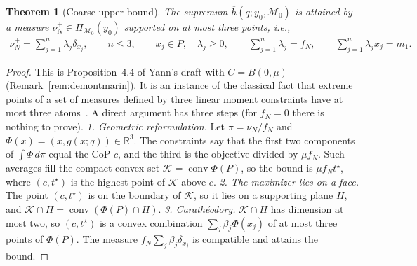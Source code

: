 \documentclass[11pt,a4paper]{article}
\theoremstyle{plain}
\newtheorem{theorem}{Theorem}[section]
\newcommand{\R}{\mathbb{R}}
\begin{document}
\begin{theorem}[Coarse upper bound]
\label{prop:coarse_upper_atomic}
    The supremum $\overline h(q;y_0,\mathcal M_0)$ is attained by a measure $\nu_N^+\in\Pi_{\mathcal M_0}(y_0)$ supported on at most three points, i.e.,
    \begin{align}
        \nu_N^+
        =
        \sum_{j=1}^{n}\lambda_j\delta_{x_j},
        \qquad n\leq 3,
        \qquad x_j\in P,\quad \lambda_j\geq 0,
        \qquad
        \sum_{j=1}^{n}\lambda_j=f_N,
        \qquad
        \sum_{j=1}^{n}\lambda_jx_j=m_1.
    \end{align}
\end{theorem}
\begin{proof}
    This is Proposition~4.4 of Yann's draft with $C=B(0,\mu)$ (Remark~\ref{rem:demontmarin}). It is an instance of the classical fact that extreme points of a set of measures defined by three
    linear moment constraints have at most three atoms~\cite{winkler1988extreme,lasserre2010moments}. A direct argument has three steps (for $f_N=0$ there is nothing to prove).
    \textit{1. Geometric reformulation.} Let $\pi=\nu_N/f_N$ and $\Phi(x)=(x,g(x;q))\in\R^3$. The constraints say that the first two components of $\int\Phi\,d\pi$ equal the CoP $c$, and the third
    is the objective divided by $\mu f_N$. Such averages fill the compact convex set $\mathcal K=\operatorname{conv}\Phi(P)$, so the bound is $\mu f_Nt^\star$, where $(c,t^\star)$ is the highest point of $\mathcal K$ above $c$.
    \textit{2. The maximizer lies on a face.} The point $(c,t^\star)$ is on the boundary of $\mathcal K$, so it lies on a supporting plane $H$, and $\mathcal K\cap H=\operatorname{conv}(\Phi(P)\cap H)$.
    \textit{3. Carath\'eodory.} $\mathcal K\cap H$ has dimension at most two, so $(c,t^\star)$ is a convex combination $\sum_j\beta_j\Phi(x_j)$ of at most three points of $\Phi(P)$.
    The measure $f_N\sum_j\beta_j\delta_{x_j}$ is compatible and attains the bound.
\end{proof}
\end{document}
